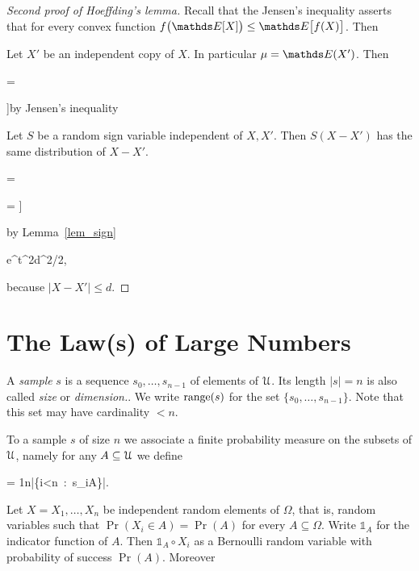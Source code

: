 \documentclass[scombinatorics.tex]{subfiles}
\begin{document}
\begin{proof}[Second proof of Hoeffding's lemma]
  Recall that the Jensen's inequality asserts that for every convex function $f\big(\Ex[X]\big)\le\Ex\big[f(X)\big]$.
  Then


  Let $X'$ be an independent copy of $X$.
  In particular $\mu=\Ex(X')$.
  Then

  \ceq{\hfill\Ex\Big[e^{t(X-\mu)}\Big]}
  {=}
  {\Ex\Big[e^{t(X-\Ex[X'])}\Big]}


  \ceq{}
  {\le}
  {\Ex\Big[\Ex\big[e^{t(X-X')}\, |\, X\big]\Big]}\hfill by Jensen's inequality

  \ceq{}
  {\le}
  {\Ex\Big[e^{t(X-X')}\Big]}

  Let $S$ be a random sign variable independent of $X,X'$.
  Then $S(X-X')$ has the same distribution of $X-X'$.

  \ceq{}
  {=}
  {\Ex\Big[e^{tS(X-X')}\Big]}

  \ceq{}
  {=}
  {\Ex\bigg[\Ex\Big[e^{tS(X-X')}\ |\ X,X'\Big]\bigg]}
  
  \ceq{}
  {\le}
  {\Ex\Big[e^{t^2(X-X')^2/2}\Big]}
  \hfill by Lemma~\ref{lem_sign}
      
  \ceq{}
  {\le}
  {e^{t^2d^2/2},}
  
  because $|X-X'|\le d$.
\end{proof}

\section{The Law(s) of Large Numbers}\label{samples}

A \emph{sample\/} $s$ is a sequence $s_0,\dots,s_{n-1}$ of elements of $\EuScript U$.
Its length $|s|=n$ is also called \emph{size\/} or \emph{dimension.}.
We write $\mathop{\rm range}(s)$ for the set $\{s_0,\dots,s_{n-1}\}$.
Note that this set may have cardinality $<n$.

To a sample $s$ of size $n$ we associate a finite probability measure on the subsets of $\EuScript U$, namely for any $A\subseteq\EuScript U$ we define 

{=}
{\frac1n\cdot \big|\big\{i<n\ :\ s_i\in A\big\}\big|.}

Let $X=X_1,\dots,X_n$ be independent random elements of $\Omega$, that is, random variables such that $\Pr(X_i\in A)=\Pr(A)$ for every $A\subseteq\Omega$.
Write ${\mathds 1}_A$ for the indicator function of $A$. 
Then ${\mathds 1}_A{\circ} X_i$ as a Bernoulli random variable with probability of success $\Pr(A)$.
Moreover
\end{document}
